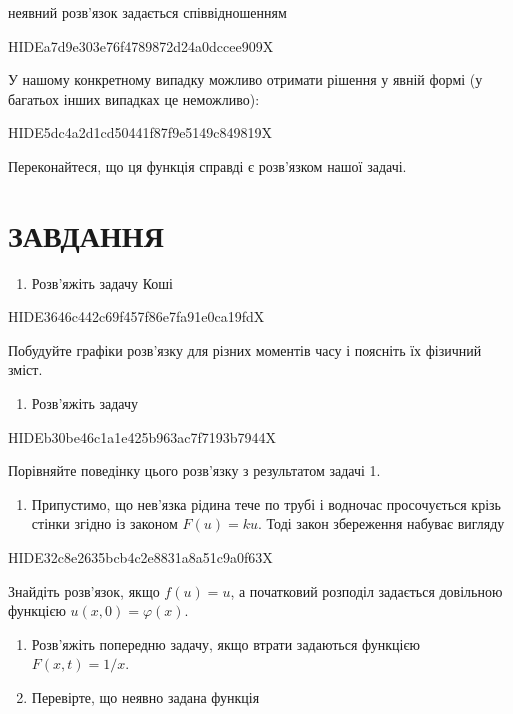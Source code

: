 \documentclass[
  ukrainian,
]{article}
\providecommand{\tightlist}{%
  \setlength{\itemsep}{0pt}\setlength{\parskip}{0pt}}
\begin{document}
неявний розв'язок задається співвідношенням

HIDEa7d9e303e76f4789872d24a0dccee909X

У нашому конкретному випадку можливо отримати рішення у явній формі (у
багатьох інших випадках це неможливо):

HIDE5dc4a2d1cd50441f87f9e5149c849819X

Переконайтеся, що ця функція справді є розв'язком нашої задачі.

\section{ЗАВДАННЯ}\label{ux437ux430ux432ux434ux430ux43dux43dux44f-12}

\begin{enumerate}
\def\labelenumi{\arabic{enumi}.}
\tightlist
\item
  Розв'яжіть задачу Коші
\end{enumerate}

HIDE3646c442c69f457f86e7fa91e0ca19fdX

Побудуйте графіки розв'язку для різних моментів часу і поясніть їх
фізичний зміст.

\begin{enumerate}
\def\labelenumi{\arabic{enumi}.}
\setcounter{enumi}{1}
\tightlist
\item
  Розв'яжіть задачу
\end{enumerate}

HIDEb30be46c1a1e425b963ac7f7193b7944X

Порівняйте поведінку цього розв'язку з результатом задачі 1.

\begin{enumerate}
\def\labelenumi{\arabic{enumi}.}
\setcounter{enumi}{2}
\tightlist
\item
  Припустимо, що нев'язка рідина тече по трубі і водночас просочується
  крізь стінки згідно із законом \(F(u)=ku\). Тоді закон збереження
  набуває вигляду
\end{enumerate}

HIDE32c8e2635bcb4c2e8831a8a51c9a0f63X

Знайдіть розв'язок, якщо \(f(u)=u\), а початковий розподіл задається
довільною функцією \(u(x,0)=\varphi(x)\).

\begin{enumerate}
\def\labelenumi{\arabic{enumi}.}
\setcounter{enumi}{3}
\item
  Розв'яжіть попередню задачу, якщо втрати задаються функцією
  \(F(x,t)=1/x\).
\item
  Перевірте, що неявно задана функція
\end{enumerate}
\end{document}
